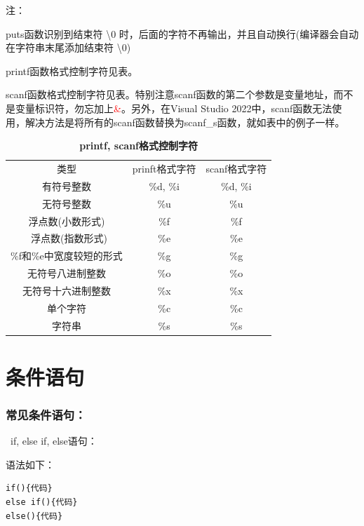 \documentclass[zihao=-4,UTF8]{report}
\begin{document}
\noindent 注：\par
puts函数识别到结束符 \textbackslash 0 时，后面的字符不再输出，并且自动换行(编译器会自动在字符串末尾添加结束符 \textbackslash 0)\par
printf函数格式控制字符见表。\par
scanf函数格式控制字符见表。特别注意scanf函数的第二个参数是变量地址，而不是变量标识符，勿忘加上\textcolor{red}{\&}。另外，在Visual Studio 2022中，scanf函数无法使用，解决方法是将所有的scanf函数替换为scanf\_s函数，就如表中的例子一样。
\begin{table}[H]
    \centering
    \caption{\textbf{printf, scanf格式控制字符}}
    \begin{tabular}{ccc} 
    \toprule
    类型              & prinft格式字符 & scanf格式字符  \\
    有符号整数           & \%d, \%i   & \%d, \%i   \\
    无符号整数           & \%u        & \%u        \\
    浮点数(小数形式)       & \%f        & \%f        \\
    ~浮点数(指数形式)      & \%e        & \%e        \\
    \%f和\%e中宽度较短的形式 & \%g        & \%g        \\
    无符号八进制整数        & \%o        & \%o        \\
    无符号十六进制整数       & \%x        & \%x        \\
    单个字符            & \%c        & \%c        \\
    字符串             & \%s        & \%s        \\
    \bottomrule
    \end{tabular}
    \end{table}

\section{条件语句}
\subsubsection{常见条件语句：}
\ if, else if, else语句：\par
语法如下：
\begin{lstlisting}
if(){代码}
else if(){代码}
else(){代码}
\end{lstlisting}
\end{document}
